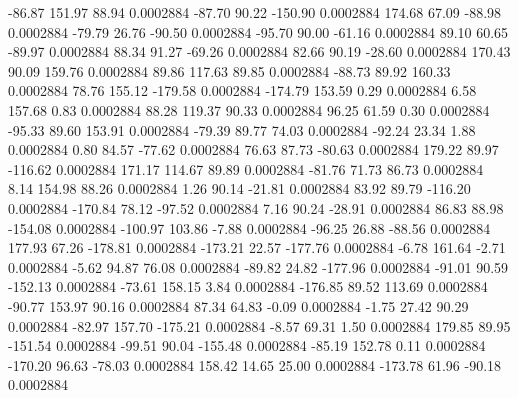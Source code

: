       -86.87      151.97       88.94     0.0002884
      -87.70       90.22     -150.90     0.0002884
      174.68       67.09      -88.98     0.0002884
      -79.79       26.76      -90.50     0.0002884
      -95.70       90.00      -61.16     0.0002884
       89.10       60.65      -89.97     0.0002884
       88.34       91.27      -69.26     0.0002884
       82.66       90.19      -28.60     0.0002884
      170.43       90.09      159.76     0.0002884
       89.86      117.63       89.85     0.0002884
      -88.73       89.92      160.33     0.0002884
       78.76      155.12     -179.58     0.0002884
     -174.79      153.59        0.29     0.0002884
        6.58      157.68        0.83     0.0002884
       88.28      119.37       90.33     0.0002884
       96.25       61.59        0.30     0.0002884
      -95.33       89.60      153.91     0.0002884
      -79.39       89.77       74.03     0.0002884
      -92.24       23.34        1.88     0.0002884
        0.80       84.57      -77.62     0.0002884
       76.63       87.73      -80.63     0.0002884
      179.22       89.97     -116.62     0.0002884
      171.17      114.67       89.89     0.0002884
      -81.76       71.73       86.73     0.0002884
        8.14      154.98       88.26     0.0002884
        1.26       90.14      -21.81     0.0002884
       83.92       89.79     -116.20     0.0002884
     -170.84       78.12      -97.52     0.0002884
        7.16       90.24      -28.91     0.0002884
       86.83       88.98     -154.08     0.0002884
     -100.97      103.86       -7.88     0.0002884
      -96.25       26.88      -88.56     0.0002884
      177.93       67.26     -178.81     0.0002884
     -173.21       22.57     -177.76     0.0002884
       -6.78      161.64       -2.71     0.0002884
       -5.62       94.87       76.08     0.0002884
      -89.82       24.82     -177.96     0.0002884
      -91.01       90.59     -152.13     0.0002884
      -73.61      158.15        3.84     0.0002884
     -176.85       89.52      113.69     0.0002884
      -90.77      153.97       90.16     0.0002884
       87.34       64.83       -0.09     0.0002884
       -1.75       27.42       90.29     0.0002884
      -82.97      157.70     -175.21     0.0002884
       -8.57       69.31        1.50     0.0002884
      179.85       89.95     -151.54     0.0002884
      -99.51       90.04     -155.48     0.0002884
      -85.19      152.78        0.11     0.0002884
     -170.20       96.63      -78.03     0.0002884
      158.42       14.65       25.00     0.0002884
     -173.78       61.96      -90.18     0.0002884
